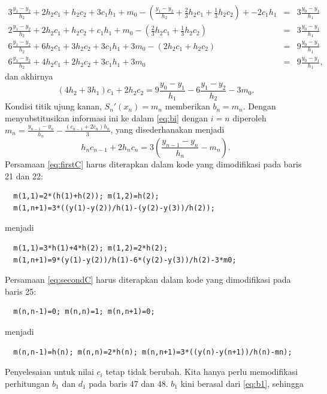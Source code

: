 \begin{description}
\begin{eqnarray*}
3\frac{y_{1}-y_{2}}{h_{2}}+2h_{2}c_{1}+h_{2}c_{2}+3c_{1}h_{1}+m_{0}-\left(\frac{y_{1}-y_{2}}{h_{2}}+\frac{2}{3}h_{2}c_{1}+\frac{1}{3}h_{2}c_{2}\right)+-2c_{1}h_{1} & = & 3\frac{y_{0}-y_{1}}{h_{1}}\\
2\frac{y_{1}-y_{2}}{h_{2}}+2h_{2}c_{1}+h_{2}c_{2}+c_{1}h_{1}+m_{0}-\left(\frac{2}{3}h_{2}c_{1}+\frac{1}{3}h_{2}c_{2}\right) & = & 3\frac{y_{0}-y_{1}}{h_{1}}\\
6\frac{y_{1}-y_{2}}{h_{2}}+6h_{2}c_{1}+3h_{2}c_{2}+3c_{1}h_{1}+3m_{0}-\left(2h_{2}c_{1}+h_{2}c_{2}\right) & = & 9\frac{y_{0}-y_{1}}{h_{1}}\\
6\frac{y_{1}-y_{2}}{h_{2}}+4h_{2}c_{1}+2h_{2}c_{2}+3c_{1}h_{1}+3m_{0} & = & 9\frac{y_{0}-y_{1}}{h_{1}},
\end{eqnarray*}
dan akhirnya 
\begin{equation}
\left(4h_{2}+3h_{1}\right)c_{1}+2h_{2}c_{2}=9\frac{y_{0}-y_{1}}{h_{1}}-6\frac{y_{1}-y_{2}}{h_{2}}-3m_{0}.\label{eq:firstC}
\end{equation}
Kondisi titik ujung kanan, $S_{n}'(x_{n})=m_{n}$ memberikan $b_{n}=m_{n}$.
Dengan menyubstitusikan informasi ini ke dalam \ref{eq:bi} dengan
$i=n$ diperoleh $m_{n}=\frac{y_{n-1}-y_{n}}{h_{n}}-\frac{(c_{n-1}+2c_{n})h_{n}}{3}$,
yang disederhanakan menjadi
\begin{equation}
h_{n}c_{n-1}+2h_{n}c_{n}=3\left(\frac{y_{n-1}-y_{n}}{h_{n}}-m_{n}\right).\label{eq:secondC}
\end{equation}
Persamaan \ref{eq:firstC} harus diterapkan dalam kode yang dimodifikasi
pada baris 21 dan 22: \begin{verbatim}
  m(1,1)=2*(h(1)+h(2)); m(1,2)=h(2);
  m(1,n+1)=3*((y(1)-y(2))/h(1)-(y(2)-y(3))/h(2)); 
\end{verbatim}menjadi\begin{verbatim}
  m(1,1)=3*h(1)+4*h(2); m(1,2)=2*h(2);
  m(1,n+1)=9*(y(1)-y(2))/h(1)-6*(y(2)-y(3))/h(2)-3*m0; 
\end{verbatim} Persamaan \ref{eq:secondC} harus diterapkan dalam kode yang dimodifikasi
pada baris 25:\begin{verbatim}
  m(n,n-1)=0; m(n,n)=1; m(n,n+1)=0;
\end{verbatim}menjadi\begin{verbatim}
  m(n,n-1)=h(n); m(n,n)=2*h(n); m(n,n+1)=3*((y(n)-y(n+1))/h(n)-mn);
\end{verbatim} Penyelesaian untuk nilai $c_{i}$ tetap tidak berubah. Kita hanya
perlu memodifikasi perhitungan $b_{1}$ dan $d_{1}$ pada baris 47
dan 48. $b_{1}$ kini berasal dari \ref{eq:b1}, sehingga \begin{verbatim}

\end{verbatim}
\end{description}
